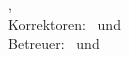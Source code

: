 \hfill
\vfill
{
	\small
	\textbf{\thesisName} \\
	\textit{\thesisTitle} \\
	\thesisSubject, \thesisDate\\ %
	Korrektoren: \thesisFirstReviewer\ und \thesisSecondReviewer\\ %
	Betreuer: \thesisFirstSupervisor\ und \thesisSecondSupervisor\\[1.5em] %
	\textbf{\thesisUniversity} \\
	\textit{\thesisUniversityGroup} \\
	\thesisUniversityInstitute\\ %
	\thesisUniversityDepartment\\ %
	\thesisUniversityStreetAddress\\ %
	\thesisUniversityPostalCode\ \thesisUniversityCity\
}
